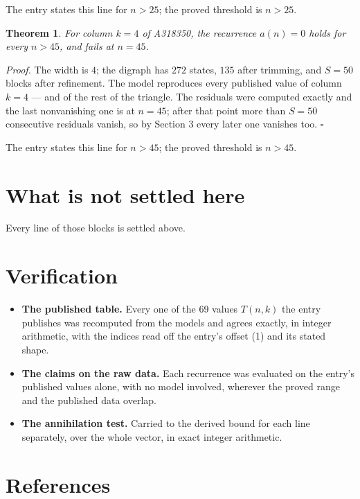 \documentclass[11pt]{article}
\newtheorem{theorem}{Theorem}
\theoremstyle{definition}
\begin{document}
The entry states this line for $n > 25$; the proved threshold is $n > 25$.

\begin{theorem} For column $k = 4$ of A318350, the recurrence $a(n) = 0$ holds for every $n > 45$, and fails at $n = 45$.\end{theorem}

{\itshape Proof.} The width is $4$; the digraph has $272$ states, $135$ after trimming, and $S = 50$ blocks after refinement. The model reproduces every published value of column $k = 4$ --- and of the rest of the triangle. The residuals were computed exactly and the last nonvanishing one is at $n = 45$; after that point more than $S = 50$ consecutive residuals vanish, so by Section 3 every later one vanishes too. $\square$

The entry states this line for $n > 45$; the proved threshold is $n > 45$.

\section{What is not settled here}

Every line of those blocks is settled above.

\section{Verification}

\begin{itemize}

\item {\bfseries The published table.} Every one of the 69 values $T(n,k)$ the entry publishes was recomputed from the models and agrees exactly, in integer arithmetic, with the indices read off the entry's offset (1) and its stated shape.

\item {\bfseries The claims on the raw data.} Each recurrence was evaluated on the entry's published values alone, with no model involved, wherever the proved range and the published data overlap.

\item {\bfseries The annihilation test.} Carried to the derived bound for each line separately, over the whole vector, in exact integer arithmetic.

\end{itemize}

\section{References}
\end{document}
